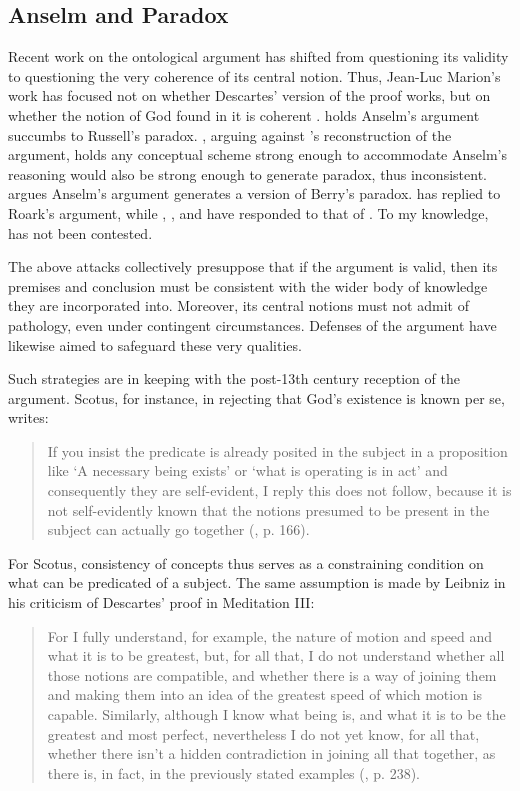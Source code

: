 \documentclass[]{birkjour}
\begin{document}
\subsection{Anselm and Paradox}
Recent work on the ontological argument has shifted from questioning its validity to questioning the very coherence of its central notion. Thus, Jean-Luc Marion's work has focused not on whether Descartes' version of the proof works, but on whether the notion of God found in it is coherent \cite{Marion1986}. \cite{Viger2002} holds Anselm's argument succumbs to Russell's paradox. \cite{Roark2003}, arguing against \cite{Klima2000}'s reconstruction of the argument, holds any conceptual scheme strong enough to accommodate Anselm's reasoning would also be strong enough to generate paradox, thus inconsistent. \cite{Schlenker2009} argues Anselm's argument generates a version of Berry's paradox. \cite{Klima2003} has replied to Roark's argument, while \cite{Neuhaus2007}, \cite{Nowicki2006}, and \cite{Uckelman2010} have responded to that of \cite{Viger2002}. To my knowledge, \cite{Schlenker2009} has not been contested.

The above attacks collectively presuppose that if the argument is valid, then its premises and conclusion must be consistent with the wider body of knowledge they are incorporated into. Moreover, its central notions must not admit of pathology, even under contingent circumstances. Defenses of the argument have likewise aimed to safeguard these very qualities.

Such strategies are in keeping with the post-13th century reception of the argument. Scotus, for instance, in rejecting that God's existence is known per se, writes:

\begin{quote}
If you insist the predicate is already posited in the subject in a proposition like `A necessary being exists' or `what is operating is in act' and consequently they are self-evident, I reply this does not follow, because it is not self-evidently known that the notions presumed to be present in the subject can actually go together (\cite{Scotus1966}, p. 166).
\end{quote}

For Scotus, consistency of concepts thus serves as a constraining condition on what can be predicated of a subject. The same assumption is made by Leibniz in his criticism of Descartes' proof in Meditation III:

\begin{quote}
For I fully understand, for example, the nature of motion and speed and what it is to be greatest, but, for all that, I do not understand whether all those notions are compatible, and whether there is a way of joining them and making them into an idea of the greatest speed of which motion is capable. Similarly, although I know what being is, and what it is to be the greatest and most perfect, nevertheless I do not yet know, for all that, whether there isn't a hidden contradiction in joining all that together, as there is, in fact, in the previously stated examples (\cite{AG}, p. 238).
\end{quote}
\end{document}
